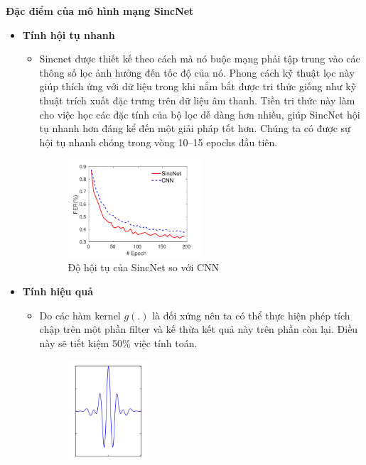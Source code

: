 \documentclass{article}
\begin{document}
	
	\textbf{Đặc điểm của mô hình mạng SincNet}
	\begin{itemize}
		\item \textbf{Tính hội tụ nhanh}
		\begin{itemize}
			\item Sincnet được thiết kế theo cách mà nó buộc mạng phải tập trung vào các thông số lọc ảnh hưởng đến tốc độ của nó. Phong cách kỹ thuật lọc này giúp thích ứng với dữ liệu trong khi nắm bắt được tri thức giống như kỹ thuật trích xuất đặc trưng trên dữ liệu âm thanh. Tiền tri thức này làm cho việc học các đặc tính của bộ lọc dễ dàng hơn nhiều, giúp SincNet hội tụ nhanh hơn đáng kể đến một giải pháp tốt hơn. Chúng ta có được sự hội tụ nhanh chóng trong vòng 10–15 epochs đầu tiên.
			\begin{figure}[H]
				\centering
				\includegraphics[width=0.5\textwidth]{images/fast_convergence.png}
				\caption{Độ hội tụ của SincNet so với CNN}
				\label{fig:writing-thesis}
			\end{figure}
		\end{itemize}
		\item \textbf{Tính hiệu quả}
		\begin{itemize}
			\item Do các hàm kernel $g(.)$ là đối xứng nên ta có thể thực hiện phép tích chập trên một phần filter và kế thừa kết quả này trên phần còn lại. Điều này sẽ tiết kiệm 50\% việc tính toán.
			\begin{figure}[H]
				\centering
				\includegraphics[width=0.3\textwidth]{images/g_symmetric.png}

\end{figure}
\end{itemize}
\end{itemize}
\end{document}
